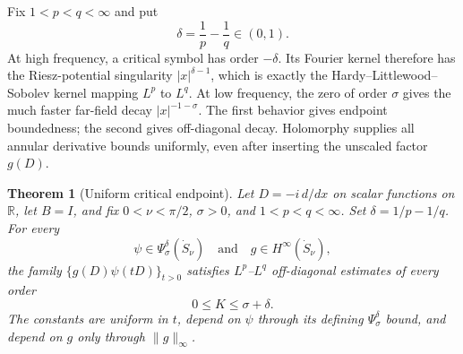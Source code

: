 \documentclass[11pt]{article}
\newtheorem{theorem}{Theorem}
\newcommand{\R}{\mathbb R}
\newcommand{\1}{\mathbf 1}
\newcommand{\Hinfty}{H^\infty}
\newcommand{\Psiclass}[2]{\Psi_{#1}^{#2}}
\begin{document}
Fix $1<p<q<\infty$ and put
\[
 \delta=\frac1p-\frac1q\in(0,1).
\]
At high frequency, a critical symbol has order $-\delta$.  Its Fourier
kernel therefore has the Riesz-potential singularity $|x|^{\delta-1}$,
which is exactly the Hardy--Littlewood--Sobolev kernel mapping $L^p$ to
$L^q$.  At low frequency, the zero of order $\sigma$ gives the much faster
far-field decay $|x|^{-1-\sigma}$.  The first behavior gives endpoint
boundedness; the second gives off-diagonal decay.  Holomorphy supplies all
annular derivative bounds uniformly, even after inserting the unscaled
factor $g(D)$.

\begin{theorem}[Uniform critical endpoint]
Let $D=-i\,d/dx$ on scalar functions on $\R$, let $B=I$, and fix
$0<\nu<\pi/2$, $\sigma>0$, and $1<p<q<\infty$.  Set
$\delta=1/p-1/q$.  For every
\[
 \psi\in\Psiclass{\sigma}{\delta}(\dot S_\nu)
 \quad\text{and}\quad g\in\Hinfty(\dot S_\nu),
\]
the family $\{g(D)\psi(tD)\}_{t>0}$ satisfies $L^p$--$L^q$
off-diagonal estimates of every order
\[
 0\le K\le \sigma+\delta.
\]
The constants are uniform in $t$, depend on $\psi$ through its defining
$\Psiclass{\sigma}{\delta}$ bound, and depend on $g$ only through
$\|g\|_\infty$.
\end{theorem}
\end{document}
